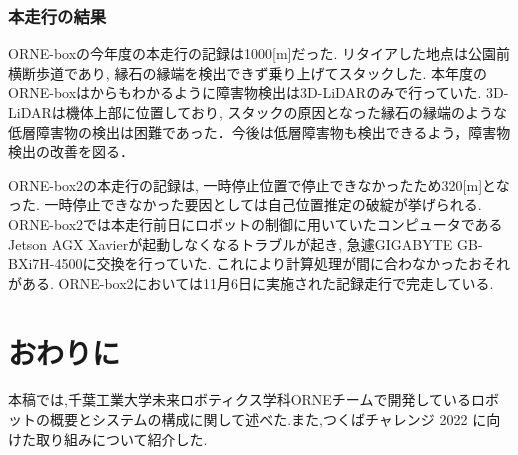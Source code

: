 \documentclass[uplatex, twocolumn, 9pt]{jsproceedings}
\begin{document}
\subsubsection{本走行の結果}
ORNE-boxの今年度の本走行の記録は1000[m]だった. リタイアした地点は公園前横断歩道であり, 縁石の縁端を検出できず乗り上げてスタックした. 本年度のORNE-boxはからもわかるように障害物検出は3D-LiDARのみで行っていた. 3D-LiDARは機体上部に位置しており, スタックの原因となった縁石の縁端のような低層障害物の検出は困難であった．今後は低層障害物も検出できるよう，障害物検出の改善を図る．\par
ORNE-box2の本走行の記録は, 一時停止位置で停止できなかったため320[m]となった. 一時停止できなかった要因としては自己位置推定の破綻が挙げられる. ORNE-box2では本走行前日にロボットの制御に用いていたコンピュータであるJetson AGX Xavierが起動しなくなるトラブルが起き, 急遽GIGABYTE GB-BXi7H-4500に交換を行っていた. これにより計算処理が間に合わなかったおそれがある. ORNE-box2においては11月6日に実施された記録走行で完走している. 

\section{おわりに}
本稿では,千葉工業大学未来ロボティクス学科ORNEチームで開発しているロボットの概要とシステムの構成に関して述べた.また,つくばチャレンジ 2022 に向けた取り組みについて紹介した.

\end{document}
